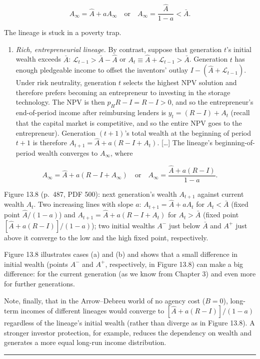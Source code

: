 \documentclass[11pt,a4paper]{article}
\providecommand{\tightlist}{\setlength{\itemsep}{0pt}\setlength{\parskip}{0pt}}
\newcommand{\stmtend}{\par\endgroup\nopagebreak\noindent\rule{\linewidth}{0.4pt}\par\medskip}
\begin{document}
\[A_\infty = \hat A + aA_\infty \quad\text{or}\quad A_\infty = \frac{\hat A}{1 - a} < \bar A.\]

The lineage is stuck in a poverty trap.

\begin{enumerate}
\def\labelenumi{(\alph{enumi})}
\setcounter{enumi}{1}
\tightlist
\item
  \emph{Rich, entrepreneurial lineage.} By contrast, suppose that generation \(t\)'s initial wealth
  exceeds \(\bar A\): \(\mathcal{L}_{t-1} > \bar A - \hat A\) or
  \(A_t \equiv \hat A + \mathcal{L}_{t-1} > \bar A\). Generation \(t\) has enough pledgeable income
  to offset the inventors' outlay \(I - (\hat A + \mathcal{L}_{t-1})\). Under risk neutrality,
  generation \(t\) selects the highest NPV solution and therefore prefers becoming an entrepreneur
  to investing in the storage technology. The NPV is then \(p_H R - I = R - I > 0\), and so the
  entrepreneur's end-of-period income after reimbursing lenders is \(y_t = (R - I) + A_t\) (recall
  that the capital market is competitive, and so the entire NPV goes to the entrepreneur).
  Generation \((t + 1)\)'s total wealth at the beginning of period \(t + 1\) is therefore
  \(A_{t+1} = \hat A + a(R - I + A_t)\). {[}\ldots{]} The lineage's beginning-of-period wealth
  converges to \(A_\infty\), where
\end{enumerate}

\[A_\infty = \hat A + a(R - I + A_\infty) \quad\text{or}\quad A_\infty = \frac{\hat A + a(R - I)}{1 - a}.\]

Figure 13.8 (p.~487, PDF 500): next generation's wealth \(A_{t+1}\) against current wealth \(A_t\).
Two increasing lines with slope \(a\): \(A_{t+1} = \hat A + aA_t\) for \(A_t < \bar A\) (fixed point
\(\hat A/(1 - a)\)) and \(A_{t+1} = \hat A + a(R - I + A_t)\) for \(A_t > \bar A\) (fixed point
\([\hat A + a(R - I)]/(1 - a)\)); two initial wealths \(A^-\) just below \(\bar A\) and \(A^+\) just
above it converge to the low and the high fixed point, respectively.

Figure 13.8 illustrates cases (a) and (b) and shows that a small difference in initial wealth
(points \(A^-\) and \(A^+\), respectively, in Figure 13.8) can make a big difference: for the
current generation (as we know from Chapter 3) and even more for further generations.

Note, finally, that in the Arrow--Debreu world of no agency cost (\(B = 0\)), long-term incomes of
different lineages would converge to \([\hat A + a(R - I)]/(1 - a)\) regardless of the lineage's
initial wealth (rather than diverge as in Figure 13.8). A stronger investor protection, for example,
reduces the dependency on wealth and generates a more equal long-run income distribution.
\stmtend
\end{document}

